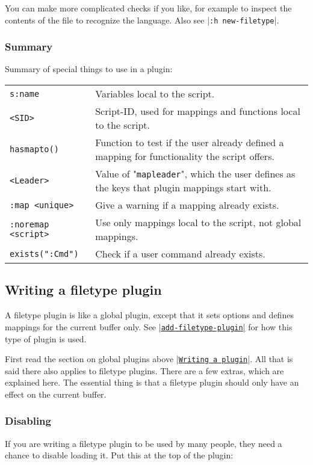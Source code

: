 You can make more complicated checks if you like, for example to inspect the contents of the file to recognize the language.
Also see |\verb!:h new-filetype!|.
\subsubsection{Summary}
\label{plugin-special}

Summary of special things to use in a plugin:
\begin{center} \begin{tabular}{l l}
				\verb!s:name! & Variables local to the script. \\
				\verb!<SID>! & Script-ID, used for mappings and functions local to the script. \\
				\verb!hasmapto()! & Function to test if the user already defined a mapping for functionality the script offers. \\
				\verb!<Leader>! & Value of "\texttt{mapleader}", which the user defines as the keys that plugin mappings start with. \\
				\verb!:map <unique>! & Give a warning if a mapping already exists. \\
				\verb!:noremap <script>! & Use only mappings local to the script, not global mappings. \\
				\verb!exists(":Cmd")! & Check if a user command already exists. \\
\end{tabular} \end{center}
\subsection{Writing a filetype plugin}
\label{write-filetype-plugin}
\label{ftplugin}
A filetype plugin is like a global plugin, except that it sets options and defines mappings for the current buffer only.
See \hyperref[add-filetype-plugin]{|\texttt{add-filetype-plugin}|} for how this type of plugin is used.

First read the section on global plugins above |\hyperref[Writing a plugin]{\texttt{Writing a plugin}}|.
All that is said there also applies to filetype plugins.
There are a few extras, which are explained here.
The essential thing is that a filetype plugin should only have an effect on the current buffer.

\subsubsection{Disabling}
If you are writing a filetype plugin to be used by many people, they need a chance to disable loading it.
Put this at the top of the plugin:

